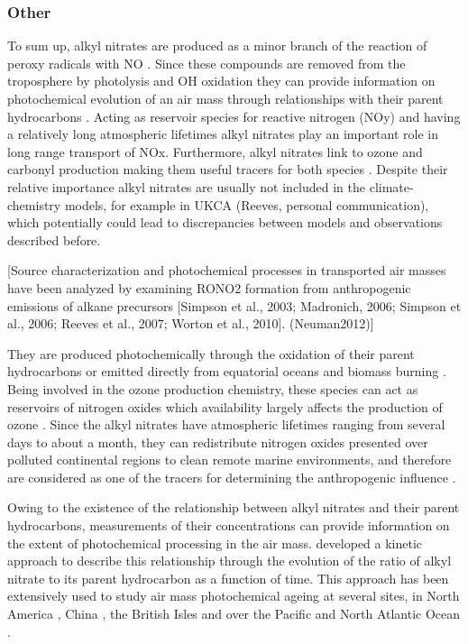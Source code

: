 \documentclass[11pt,a4paper]{article}
\begin{document}
\subsubsection*{Other}

To sum up, alkyl nitrates are produced as a minor branch of the reaction of peroxy radicals with NO \citep{Day2003}. Since these compounds are removed from the troposphere by photolysis and OH oxidation they can provide information on photochemical evolution of an air mass through relationships with their parent hydrocarbons \citep{Bertman1995}. Acting as reservoir species for reactive nitrogen (NOy) and having a relatively long atmospheric lifetimes alkyl nitrates play an important role in long range transport of NOx. Furthermore, alkyl nitrates link to ozone and carbonyl production making them useful tracers for both species \citep{Worton2010}. Despite their relative importance alkyl nitrates are usually not included in the climate-chemistry models, for example in UKCA (Reeves, personal communication), which potentially could lead to discrepancies between models and observations described before. 

[Source characterization and photochemical processes in
transported air masses have been analyzed by examining
RONO2 formation from anthropogenic emissions of alkane
precursors [Simpson et al., 2003; Madronich, 2006; Simpson
et al., 2006; Reeves et al., 2007; Worton et al., 2010]. (Neuman2012)]

They are produced photochemically through the oxidation of their parent hydrocarbons \citep{Roberts1990} or emitted directly from equatorial oceans \citep{Blake2003} and biomass burning \citep{Simpson2002}. Being involved in the ozone production chemistry, these species can act as reservoirs of nitrogen oxides which availability largely affects the production of ozone \citep{Reeves2007}. Since the alkyl nitrates have atmospheric lifetimes ranging from several days to about a month, they can redistribute nitrogen oxides presented over polluted continental regions to clean remote marine environments, and therefore are considered as one of the tracers for determining the anthropogenic influence \citep{Atherton1989, Reeves2007, Worton2005}.

Owing to the existence of the relationship between alkyl nitrates and their parent hydrocarbons, measurements of their concentrations can provide information on the extent of photochemical processing in the air mass. \cite{Bertman1995} developed a kinetic approach to describe this relationship through the evolution of the ratio of alkyl nitrate to its parent hydrocarbon as a function of time. This approach has been extensively used to study air mass photochemical ageing at several sites, in North America \citep{Bertman1995, Roberts1998}, China \citep{Simpson2006}, the British Isles \citep{Worton2010} and over the Pacific \citep{Simpson2003} and North Atlantic Ocean \citep{Reeves2007}.
\end{document}
